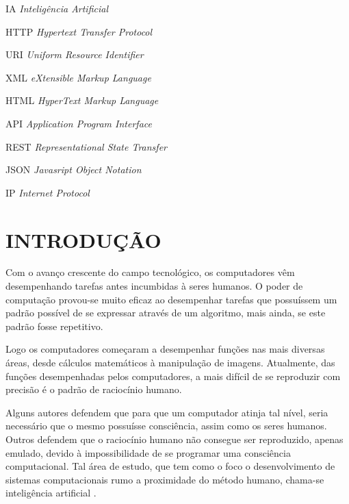 \documentclass[12pt, openright, oneside, a4paper, brazil]{abntex2}
\begin{document}
\newpage %
\listofquadros* %
\cleardoublepage

\listoffigures*
\cleardoublepage

\begin{siglas}

	\item[IA]{\textit{Inteligência Artificial}}
	\item[HTTP]{\textit{Hypertext Transfer Protocol}}
	\item[URI]{\textit{Uniform Resource Identifier}}
	\item[XML]{\textit{eXtensible Markup Language}}
	\item[HTML]{\textit{HyperText Markup Language}}
	\item[API]{\textit{Application Program Interface}}
	\item[REST]{\textit{Representational State Transfer}}
	\item[JSON]{\textit{Javasript Object Notation}}
	\item[IP]\textit{Internet Protocol}

\end{siglas}

\tableofcontents*
\textual

\chapter{INTRODUÇÃO} \label{intro}

Com o avanço crescente do campo tecnológico, os computadores vêm desempenhando tarefas antes incumbidas à seres humanos. O poder de computação provou-se muito eficaz ao desempenhar tarefas que possuíssem um padrão possível de se expressar através de um algoritmo, mais ainda, se este padrão fosse repetitivo.

Logo os computadores começaram a desempenhar funções nas mais diversas áreas, desde cálculos matemáticos à manipulação de imagens. Atualmente, das funções desempenhadas pelos computadores, a mais difícil de se reproduzir com precisão é o padrão de raciocínio humano.

Alguns autores defendem que para que um computador atinja tal nível, seria necessário que o mesmo possuísse consciência, assim como os seres humanos. Outros defendem que o raciocínio humano não consegue ser reproduzido, apenas emulado, devido à impossibilidade de se programar uma consciência computacional. Tal área de estudo, que tem como o foco o desenvolvimento de sistemas computacionais rumo a proximidade do método humano, chama-se inteligência artificial \cite{russell2004inteligencia, coppin2015inteligencia}.
\end{document}
